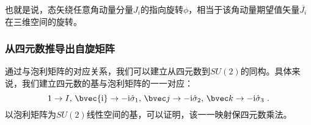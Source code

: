 也就是说，态矢绕任意角动量分量$J_i$的指向旋转$\phi$，相当于该角动量期望值矢量$\overline{J_i}$在三维空间的旋转。

\subsubsection{从四元数推导出自旋矩阵}
通过与泡利矩阵的对应关系，我们可以建立从四元数到$SU(2)$的同构。具体来说，我们建立四元数的基与泡利矩阵的一一对应：
\begin{equation}
1\rightarrow I,\,\bvec{\mathrm i}\rightarrow -\mathrm i\hat{\sigma}_1,\,\bvec j\rightarrow -\mathrm i\hat{\sigma}_2,\,\bvec k\rightarrow -\mathrm i\hat{\sigma}_3~.
\end{equation}
以泡利矩阵为$SU(2)$线性空间的基，可以证明，该一一映射保四元数乘法。
